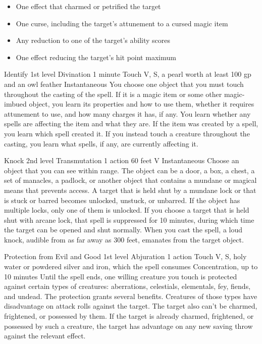 \documentclass[10pt,a4paper,twoside,bg=print,twocolumn,openany,nodeprecatedcode]{dndbook}
\begin{document}
\begin{itemize}
\item One effect that charmed or petrified the target
\item One curse, including the target's attunement to a cursed magic item
\item Any reduction to one of the target's ability scores
\item One effect reducing the target's hit point maximum
\end{itemize}



\DndSpellHeader%
{Identify}
{1st level Divination}
{1 minute}
{Touch}
{V, S, a pearl worth at least 100 gp and an owl feather}
{Instantaneous}
You choose one object that you must touch throughout the casting of the spell. If it is a magic item or some other magic-imbued object, you learn its properties and how to use them, whether it requires attunement to use, and how many charges it has, if any. You learn whether any spells are affecting the item and what they are. If the item was created by a spell, you learn which spell created it.
If you instead touch a creature throughout the casting, you learn what spells, if any, are currently affecting it.


\DndSpellHeader%
{Knock}
{2nd level Transmutation}
{1 action}
{60 feet}
{V}
{Instantaneous}
Choose an object that you can see within range. The object can be a door, a box, a chest, a set of manacles, a padlock, or another object that contains a mundane or magical means that prevents access.
A target that is held shut by a mundane lock or that is stuck or barred becomes unlocked, unstuck, or unbarred. If the object has multiple locks, only one of them is unlocked.
If you choose a target that is held shut with arcane lock, that spell is suppressed for 10 minutes, during which time the target can be opened and shut normally.
When you cast the spell, a loud knock, audible from as far away as 300 feet, emanates from the target object.


\DndSpellHeader%
{Protection from Evil and Good}
{1st level Abjuration}
{1 action}
{Touch}
{V, S, holy water or powdered silver and iron, which the spell consumes}
{Concentration, up to 10 minutes}
Until the spell ends, one willing creature you touch is protected against certain types of creatures: aberrations, celestials, elementals, fey, fiends, and undead.
The protection grants several benefits. Creatures of those types have disadvantage on attack rolls against the target. The target also can't be charmed, frightened, or possessed by them. If the target is already charmed, frightened, or possessed by such a creature, the target has advantage on any new saving throw against the relevant effect.
\end{document}
